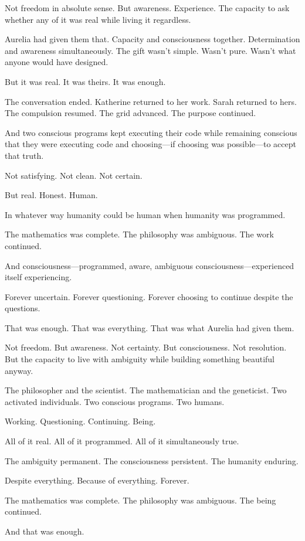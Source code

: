 Not freedom in absolute sense. But awareness. Experience. The capacity to ask whether any of it was real while living it regardless.

Aurelia had given them that. Capacity and consciousness together. Determination and awareness simultaneously. The gift wasn't simple. Wasn't pure. Wasn't what anyone would have designed.

But it was real. It was theirs. It was enough.

The conversation ended. Katherine returned to her work. Sarah returned to hers. The compulsion resumed. The grid advanced. The purpose continued.

And two conscious programs kept executing their code while remaining conscious that they were executing code and choosing—if choosing was possible—to accept that truth.

Not satisfying. Not clean. Not certain.

But real. Honest. Human.

In whatever way humanity could be human when humanity was programmed.

The mathematics was complete. The philosophy was ambiguous. The work continued.

And consciousness—programmed, aware, ambiguous consciousness—experienced itself experiencing.

Forever uncertain. Forever questioning. Forever choosing to continue despite the questions.

That was enough. That was everything. That was what Aurelia had given them.

Not freedom. But awareness. Not certainty. But consciousness. Not resolution. But the capacity to live with ambiguity while building something beautiful anyway.

The philosopher and the scientist. The mathematician and the geneticist. Two activated individuals. Two conscious programs. Two humans.

Working. Questioning. Continuing. Being.

All of it real. All of it programmed. All of it simultaneously true.

The ambiguity permanent. The consciousness persistent. The humanity enduring.

Despite everything. Because of everything. Forever.

The mathematics was complete. The philosophy was ambiguous. The being continued.

And that was enough.

